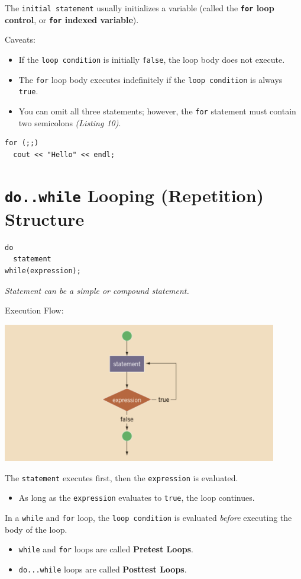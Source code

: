 \documentclass{article}
\begin{document}
The \texttt{initial statement} usually initializes a variable (called the
\textbf{\texttt{for} loop control}, or \textbf{\texttt{for} indexed variable}).

\vspace{8pt}
Caveats:
\begin{itemize}
  \item If the \texttt{loop condition} is initially \texttt{false}, the loop body does not execute.
  \item The \texttt{for} loop body executes indefinitely if the \texttt{loop condition}
is always \texttt{true}.
  \item You can omit all three statements; however, the \texttt{for} statement
    must contain two semicolons \textit{(Listing 10)}.
\end{itemize}

\begin{lstlisting}[caption={\texttt{for} Loop Gotcha}]
for (;;)
  cout << "Hello" << endl;
\end{lstlisting}

\section{\texttt{do..while} Looping (Repetition) Structure}

\begin{lstlisting}[caption={\texttt{do..while} Loop Syntax}]
do
  statement
while(expression);
\end{lstlisting}
\textit{Statement can be a simple or compound statement.}

\vspace{8pt}
Execution Flow:
\begin{center}
    \includegraphics[width=0.9\textwidth]{do-while-exec-flow.png}
\end{center}

The \texttt{statement} executes first, then the \texttt{expression} is
evaluated.
\begin{itemize}
  \item As long as the \texttt{expression} evaluates to \texttt{true}, the loop
    continues.
\end{itemize}
In a \texttt{while} and \texttt{for} loop, the \texttt{loop condition} is
evaluated \textit{before} executing the body of the loop.
\begin{itemize}
  \item \texttt{while} and \texttt{for} loops are called \textbf{Pretest Loops}.
  \item \texttt{do...while} loops are called \textbf{Posttest Loops}.
\end{itemize}
\end{document}
